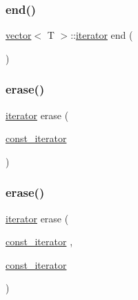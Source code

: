 \subsubsection{\texorpdfstring{end()}{end()}}
{\footnotesize\ttfamily \mbox{\hyperlink{classvector}{vector}}$<$ T $>$\+::\mbox{\hyperlink{classvector_a35c955cacac6aacaa1e82874b1628865}{iterator}} end (\begin{DoxyParamCaption}{ }\end{DoxyParamCaption})\hspace{0.3cm}{\ttfamily [noexcept]}}

\mbox{\label{classvector_ab7aae30d2341b7122fbe126517022f68}} 
\subsubsection{\texorpdfstring{erase()}{erase()}\hspace{0.1cm}{\footnotesize\ttfamily [1/28]}}
{\footnotesize\ttfamily \mbox{\hyperlink{classvector_a35c955cacac6aacaa1e82874b1628865}{iterator}} erase (\begin{DoxyParamCaption}\item[{\mbox{\hyperlink{classvector_a2fc97dce62b7053449cc868607540dba}{const\+\_\+iterator}}}]{ }\end{DoxyParamCaption})}

\mbox{\label{classvector_a876bb8aa75029705c245a8a3a0c40ea3}} 
\subsubsection{\texorpdfstring{erase()}{erase()}\hspace{0.1cm}{\footnotesize\ttfamily [2/28]}}
{\footnotesize\ttfamily \mbox{\hyperlink{classvector_a35c955cacac6aacaa1e82874b1628865}{iterator}} erase (\begin{DoxyParamCaption}\item[{\mbox{\hyperlink{classvector_a2fc97dce62b7053449cc868607540dba}{const\+\_\+iterator}}}]{,  }\item[{\mbox{\hyperlink{classvector_a2fc97dce62b7053449cc868607540dba}{const\+\_\+iterator}}}]{ }\end{DoxyParamCaption})}

\mbox{\label{classvector_aca1c34c08b059e077a84eb3505806b29}} 
